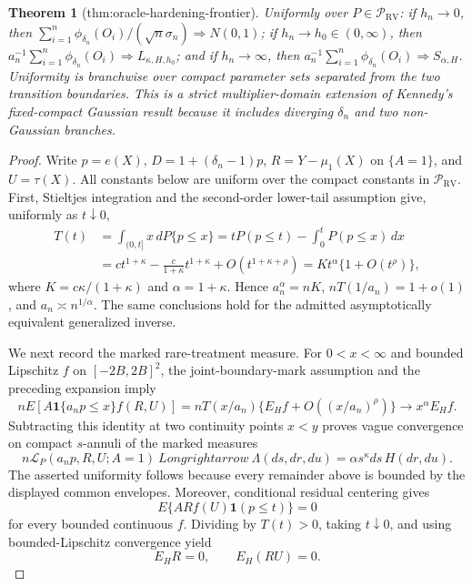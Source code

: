 \documentclass{article}
\newtheorem{theorem}{Theorem}
\begin{document}
\begin{theorem}[thm:oracle-hardening-frontier]\label{thm:oracle-hardening-frontier}
Uniformly over \(P\in\mathcal P_{\mathrm{RV}}\): if \(h_n\to0\), then \(\sum_{i=1}^n\phi_{\delta_n}(O_i)/(\sqrt n\sigma_n)\Rightarrow N(0,1)\); if \(h_n\to h_0\in(0,\infty)\), then \(a_n^{-1}\sum_{i=1}^n\phi_{\delta_n}(O_i)\Rightarrow L_{\kappa,H,h_0}\); and if \(h_n\to\infty\), then \(a_n^{-1}\sum_{i=1}^n\phi_{\delta_n}(O_i)\Rightarrow S_{\alpha,H}\). Uniformity is branchwise over compact parameter sets separated from the two transition boundaries. This is a strict multiplier-domain extension of Kennedy's fixed-compact Gaussian result because it includes diverging \(\delta_n\) and two non-Gaussian branches.
\end{theorem}
\begin{proof}
Write \(p=e(X)\), \(D=1+(\delta_n-1)p\), \(R=Y-\mu_1(X)\) on \(\{A=1\}\), and \(U=\tau(X)\).  All constants below are uniform over the compact constants in \(\mathcal P_{\mathrm{RV}}\).  First, Stieltjes integration and the second-order lower-tail assumption give, uniformly as \(t\downarrow0\),
\[
\begin{split}
 T(t)
 &=\int_{(0,t]}x\,dP\{p\leq x\}
 =tP(p\leq t)-\int_0^tP(p\leq x)\,dx\\
 &=c t^{1+\kappa}-\frac{c}{1+\kappa}t^{1+\kappa}
   +O(t^{1+\kappa+\rho})
 =K t^\alpha\{1+O(t^\rho)\},
\end{split}
\]
where \(K=c\kappa/(1+\kappa)\) and \(\alpha=1+\kappa\).  Hence \(a_n^\alpha=nK\), \(nT(1/a_n)=1+o(1)\), and \(a_n\asymp n^{1/\alpha}\).  The same conclusions hold for the admitted asymptotically equivalent generalized inverse.

We next record the marked rare-treatment measure.  For \(0<x<\infty\) and bounded Lipschitz \(f\) on \([-2B,2B]^2\), the joint-boundary-mark assumption and the preceding expansion imply
\[
 nE\!\left[A\mathbf1\{a_np\leq x\}f(R,U)\right]
 =nT(x/a_n)\{E_Hf+O((x/a_n)^\rho)\}
 \longrightarrow x^\alpha E_Hf.
\]
Subtracting this identity at two continuity points \(x<y\) proves vague convergence on compact \(s\)-annuli of the marked measures
\[
 n\mathcal L_P(a_np,R,U;A=1)
 \ Longrightarrow\ 
 \Lambda(ds,dr,du)=\alpha s^\kappa ds\,H(dr,du).
\]
The asserted uniformity follows because every remainder above is bounded by the displayed common envelopes.  Moreover, conditional residual centering gives
\[
 E\{A R f(U)\mathbf1(p\leq t)\}=0
\]
for every bounded continuous \(f\).  Dividing by \(T(t)>0\), taking \(t\downarrow0\), and using bounded-Lipschitz convergence yield
\[
 E_HR=0,\qquad E_H(RU)=0. \tag{1}
\]


\end{proof}
\end{document}
